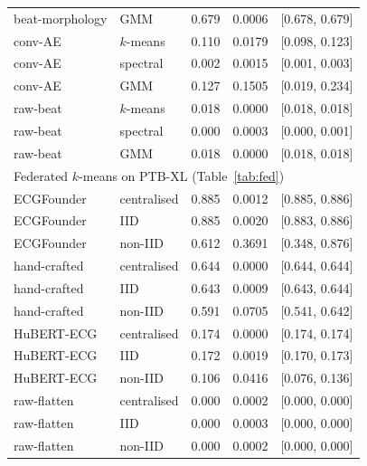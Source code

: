 \documentclass[preprint,11pt]{elsarticle}
\begin{document}
\begin{table}[ht]
\begin{tabular}{llrrc}
beat-morphology & GMM       & 0.679 & 0.0006 & [0.678, 0.679] \\
conv-AE         & $k$-means & 0.110 & 0.0179 & [0.098, 0.123] \\
conv-AE         & spectral  & 0.002 & 0.0015 & [0.001, 0.003] \\
conv-AE         & GMM       & 0.127 & 0.1505 & [0.019, 0.234] \\
raw-beat        & $k$-means & 0.018 & 0.0000 & [0.018, 0.018] \\
raw-beat        & spectral  & 0.000 & 0.0003 & [0.000, 0.001] \\
raw-beat        & GMM       & 0.018 & 0.0000 & [0.018, 0.018] \\
\midrule
\multicolumn{5}{l}{Federated $k$-means on PTB-XL (Table~\ref{tab:fed})} \\
ECGFounder   & centralised & 0.885 & 0.0012 & [0.885, 0.886] \\
ECGFounder   & IID         & 0.885 & 0.0020 & [0.883, 0.886] \\
ECGFounder   & non-IID     & 0.612 & 0.3691 & [0.348, 0.876] \\
hand-crafted & centralised & 0.644 & 0.0000 & [0.644, 0.644] \\
hand-crafted & IID         & 0.643 & 0.0009 & [0.643, 0.644] \\
hand-crafted & non-IID     & 0.591 & 0.0705 & [0.541, 0.642] \\
HuBERT-ECG   & centralised & 0.174 & 0.0000 & [0.174, 0.174] \\
HuBERT-ECG   & IID         & 0.172 & 0.0019 & [0.170, 0.173] \\
HuBERT-ECG   & non-IID     & 0.106 & 0.0416 & [0.076, 0.136] \\
raw-flatten  & centralised & 0.000 & 0.0002 & [0.000, 0.000] \\
raw-flatten  & IID         & 0.000 & 0.0003 & [0.000, 0.000] \\
raw-flatten  & non-IID     & 0.000 & 0.0002 & [0.000, 0.000] \\
\bottomrule
\end{tabular}
\end{table}
\end{document}
